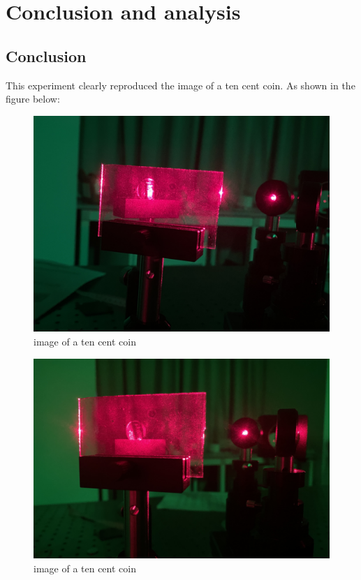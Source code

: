 \documentclass[UTF8]{article}
\begin{document}
   
\section{Conclusion and analysis}
\subsection{Conclusion}
This experiment clearly reproduced the image of a ten cent coin. As shown in the figure below:
       	\begin{figure}[H]
           	    	\centering
           	    	\includegraphics[clip,scale=0.8,trim={0 0 0 0}]{fig/fig7.png}
           	        \caption{image of a ten cent coin }
           	        \label{figure.14}
               \end{figure}

       	\begin{figure}[H]
           	    	\centering
           	    	\includegraphics[clip,scale=0.8,trim={0 0 0 0}]{fig/fig8.png}
           	        \caption{image of a ten cent coin }
           	        \label{figure.14}
               \end{figure}
               
\end{document}
